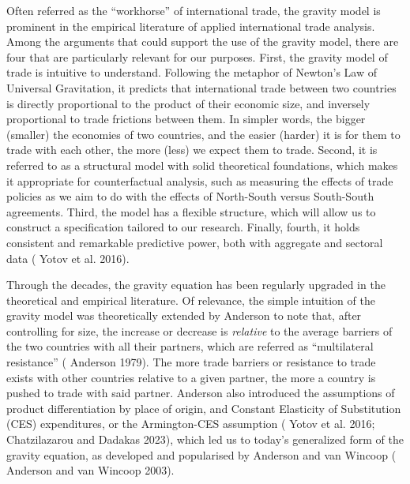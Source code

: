 Often referred as the ``workhorse'' of international trade, the gravity
model is prominent in the empirical literature of applied international
trade analysis. Among the arguments that could support the use of the
gravity model, there are four that are particularly relevant for our
purposes. First, the gravity model of trade is intuitive to understand.
Following the metaphor of Newton's Law of Universal Gravitation, it
predicts that international trade between two countries is directly
proportional to the product of their economic size, and inversely
proportional to trade frictions between them. In simpler words, the
bigger (smaller) the economies of two countries, and the easier (harder)
it is for them to trade with each other, the more (less) we expect them
to trade. Second, it is referred to as a structural model with solid
theoretical foundations, which makes it appropriate for counterfactual
analysis, such as measuring the effects of trade policies as we aim to
do with the effects of North-South versus South-South agreements. Third,
the model has a flexible structure, which will allow us to construct a
specification tailored to our research. Finally, fourth, it holds
consistent and remarkable predictive power, both with aggregate and
sectoral data (\cite{yotov_advanced_2016} Yotov et al. 2016).

Through the decades, the gravity equation has been regularly upgraded in
the theoretical and empirical literature. Of relevance, the simple
intuition of the gravity model was theoretically extended by Anderson to
note that, after controlling for size, the increase or decrease is
\emph{relative} to the average barriers of the two countries with all
their partners, which are referred as ``multilateral resistance''
(\cite{anderson_theoretical_1979} Anderson 1979). The more trade barriers or resistance to trade exists
with other countries relative to a given partner, the more a country is
pushed to trade with said partner. Anderson also introduced the
assumptions of product differentiation by place of origin, and Constant
Elasticity of Substitution (CES) expenditures, or the Armington-CES
assumption (\cite{yotov_advanced_2016} Yotov et al. 2016; \cite{chatzilazarou_trade_2023} Chatzilazarou and Dadakas 2023), which
led us to today's generalized form of the gravity equation, as developed
and popularised by Anderson and van Wincoop (\cite{anderson_gravity_2003} Anderson and van Wincoop
2003).


